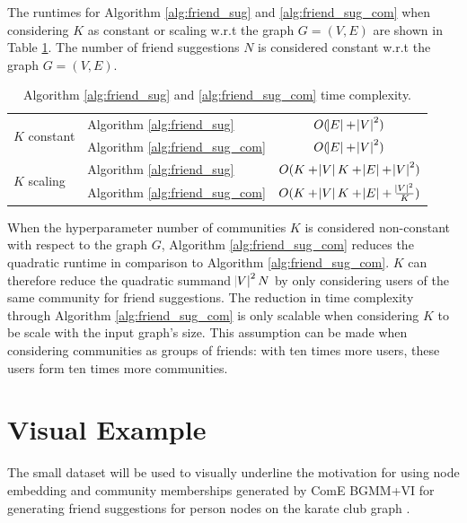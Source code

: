 \documentclass[conference]{IEEEtran}
\begin{document}
The runtimes for Algorithm \ref{alg:friend_sug} and \ref{alg:friend_sug_com} when considering $K$ as constant or scaling w.r.t the graph $G = (V, E)$ are shown in Table \ref{tab:runtimes}. The number of friend suggestions $N$ is considered constant w.r.t the graph $G = (V, E)$.

\begin{table}
    \centering
    \caption{Algorithm \ref{alg:friend_sug} and \ref{alg:friend_sug_com} time complexity.}
    \label{tab:runtimes}
    \begin{tabular}{l l | c}
        \multirow{2}{*}{$K$ constant} & Algorithm \ref{alg:friend_sug}     & $O(\abs{E} + \abs{V}^2)$                          \\
                                      & Algorithm \ref{alg:friend_sug_com} & $O(\abs{E} + \abs{V}^2)$                          \\
        \hline
        \multirow{2}{*}{$K$ scaling}  & Algorithm \ref{alg:friend_sug}     & $O(K + \abs{V}K + \abs{E} + \abs{V}^2)$           \\
                                      & Algorithm \ref{alg:friend_sug_com} & $O(K + \abs{V}K + \abs{E} + \frac{\abs{V}^2}{K})$ \\
    \end{tabular}
\end{table}

When the hyperparameter number of communities $K$ is considered non-constant with respect to the graph $G$, Algorithm \ref{alg:friend_sug_com} reduces the quadratic runtime in comparison to Algorithm \ref{alg:friend_sug_com}.
$K$ can therefore reduce the quadratic summand $\abs{V}^2N$ by only considering users of the same community for friend suggestions. The reduction in time complexity through Algorithm \ref{alg:friend_sug_com} is only scalable when considering $K$ to be scale with the input graph's size. This assumption can be made when considering communities as groups of friends: with ten times more users, these users form ten times more communities.


\section{Visual Example}

The small \citet{KarateClubDS} dataset will be used to visually underline the motivation for using node embedding and community memberships generated by ComE BGMM+VI for generating friend suggestions for person nodes on the karate club graph \cite{KarateClubDS}.
\end{document}
